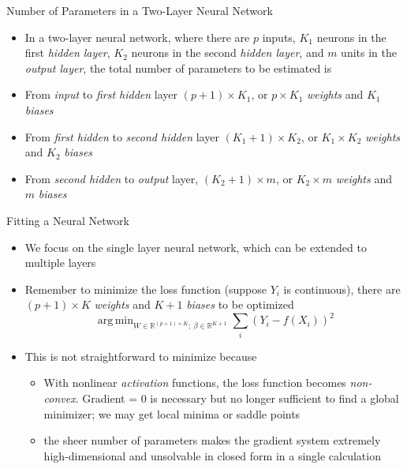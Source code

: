 \documentclass[aspectratio=1610,12pt,xcolor=dvipsnames]{beamer}
\DeclareMathOperator*{\argmin}{arg\,min}
\begin{document}
\begin{frame}{Number of Parameters in a Two-Layer Neural Network}

\begin{itemize}
    \item In a two-layer neural network, where there are $p$ inputs, $K_1$ neurons in the first \textit{hidden layer}, $K_2$ neurons in the second \textit{hidden layer}, and $m$ units in the \textit{output layer}, the total number of parameters to be estimated is 
    \item From \textit{input} to \textit{first hidden} layer $(p+1) \times K_1$, or $p\times K_1$ \textit{weights} and $K_1$ \textit{biases}
    \item From \textit{first hidden} to \textit{second hidden} layer $(K_1 + 1) \times K_2$, or $K_1 \times K_2$ \textit{weights} and $K_2$ \textit{biases}
    \item From \textit{second hidden} to \textit{output} layer, $(K_2+1) \times m$, or $K_2 \times m$ \textit{weights} and $m$ \textit{biases}
\end{itemize}
\end{frame}

\begin{frame}{Fitting a Neural Network}

\begin{itemize}
    \item We focus on the single layer neural network, which can be extended to multiple layers
    \item Remember to minimize the loss function (suppose $Y_i$ is continuous), there are $(p+1)\times K$ \textit{weights} and $K+1$ \textit{biases} to be optimized
    \[
    \argmin_{W\in \mathbb{R}^{(p+1)\times K}; \: \beta \in \mathbb{R}^{K+1}} \sum_i \left( Y_i - f(X_i)\right)^2
    \]
    \item This is not straightforward to minimize because
    \begin{itemize}
        \item With nonlinear \textit{activation} functions, the loss function becomes \textit{non-convex}. Gradient = 0 is necessary but no longer sufficient to find a global minimizer; we may get local minima or saddle points
        \item the sheer number of parameters makes the gradient system extremely high-dimensional and unsolvable in closed form in a single calculation
    \end{itemize}
\end{itemize}
\end{frame}
\end{document}
